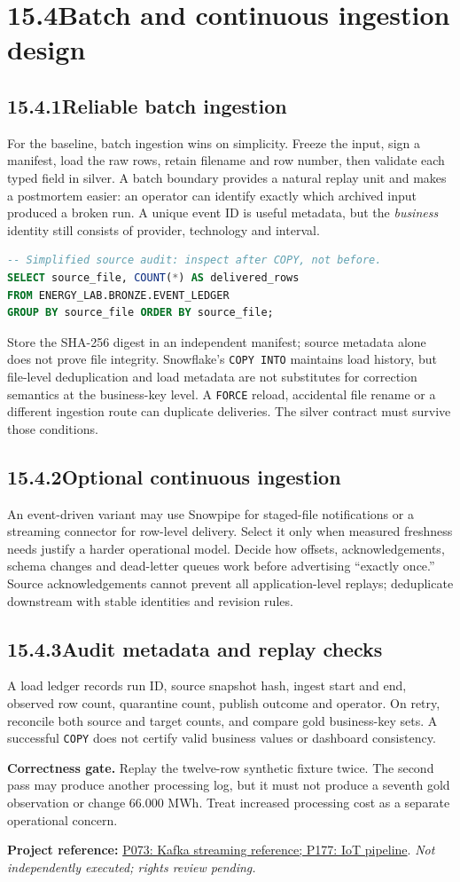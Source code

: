\documentclass[11pt,twoside]{article}
\newcommand{\topic}[2]{\subsection*{#1\quad #2}}
\newcommand{\repo}[2]{\par\begingroup\fontsize{8.0}{9.6}\selectfont\sffamily\color{inkgray}\textbf{Project reference:} \href{#2}{#1}. \textit{Not independently executed; rights review pending.}\par\endgroup}
\begin{document}
\newpage

\section*{15.4\quad Batch and continuous ingestion design}
\topic{15.4.1}{Reliable batch ingestion}
For the baseline, batch ingestion wins on simplicity. Freeze the input, sign a manifest, load the raw rows, retain filename and row number, then validate each typed field in silver. A batch boundary provides a natural replay unit and makes a postmortem easier: an operator can identify exactly which archived input produced a broken run. A unique event ID is useful metadata, but the \emph{business} identity still consists of provider, technology and interval.
\begin{lstlisting}[language=SQL]
-- Simplified source audit: inspect after COPY, not before.
SELECT source_file, COUNT(*) AS delivered_rows
FROM ENERGY_LAB.BRONZE.EVENT_LEDGER
GROUP BY source_file ORDER BY source_file;
\end{lstlisting}
Store the SHA-256 digest in an independent manifest; source metadata alone does not prove file integrity. Snowflake's \texttt{COPY INTO} maintains load history, but file-level deduplication and load metadata are not substitutes for correction semantics at the business-key level. A \texttt{FORCE} reload, accidental file rename or a different ingestion route can duplicate deliveries. The silver contract must survive those conditions.
\topic{15.4.2}{Optional continuous ingestion}
An event-driven variant may use Snowpipe for staged-file notifications or a streaming connector for row-level delivery. Select it only when measured freshness needs justify a harder operational model. Decide how offsets, acknowledgements, schema changes and dead-letter queues work before advertising ``exactly once.'' Source acknowledgements cannot prevent all application-level replays; deduplicate downstream with stable identities and revision rules.
\topic{15.4.3}{Audit metadata and replay checks}
A load ledger records run ID, source snapshot hash, ingest start and end, observed row count, quarantine count, publish outcome and operator. On retry, reconcile both source and target counts, and compare gold business-key sets. A successful \texttt{COPY} does not certify valid business values or dashboard consistency.
\begin{insight}\textbf{Correctness gate.} Replay the twelve-row synthetic fixture twice. The second pass may produce another processing log, but it must not produce a seventh gold observation or change 66.000 MWh. Treat increased processing cost as a separate operational concern.\end{insight}
\repo{P073: Kafka streaming reference; P177: IoT pipeline}{https://github.com/Snowflake-Labs/sfguide-kafka-interactive-tables-streaming}
\end{document}
